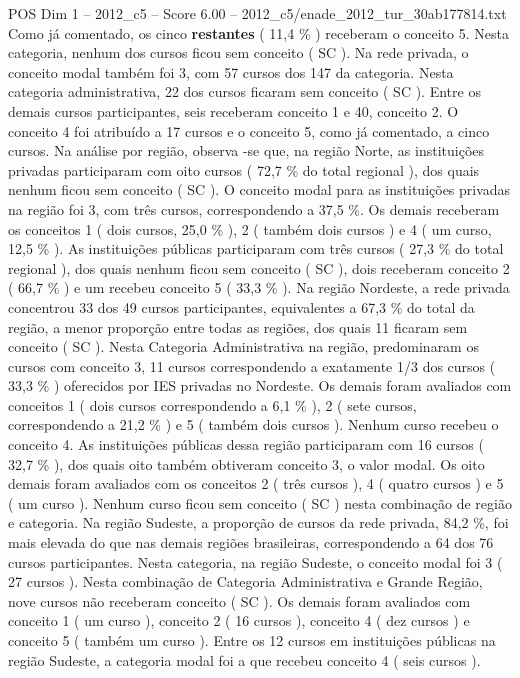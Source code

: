 \begin{textsample}{POS Dim 1 – 2012\_c5 – Score 6.00 – 2012\_c5/enade\_2012\_tur\_30ab177814.txt}
Como já comentado, os cinco \textbf{restantes} ( 11,4 \% ) receberam o conceito 5.
Nesta categoria, nenhum dos cursos ficou sem conceito ( SC ).
Na rede privada, o conceito modal também foi 3, com 57 cursos dos 147 da categoria.
Nesta categoria administrativa, 22 dos cursos ficaram sem conceito ( SC ).
Entre os demais cursos participantes, seis receberam conceito 1 e 40, conceito 2.
O conceito 4 foi atribuído a 17 cursos e o conceito 5, como já comentado, a cinco cursos.
Na análise por região, observa -se que, na região Norte, as instituições privadas participaram com oito cursos ( 72,7 \% do total regional ), dos quais nenhum ficou sem conceito ( SC ).
O conceito modal para as instituições privadas na região foi 3, com três cursos, correspondendo a 37,5 \%.
Os demais receberam os conceitos 1 ( dois cursos, 25,0 \% ), 2 ( também dois cursos ) e 4 ( um curso, 12,5 \% ).
As instituições públicas participaram com três cursos ( 27,3 \% do total regional ), dos quais nenhum ficou sem conceito ( SC ), dois receberam conceito 2 ( 66,7 \% ) e um recebeu conceito 5 ( 33,3 \% ).
Na região Nordeste, a rede privada concentrou 33 dos 49 cursos participantes, equivalentes a 67,3 \% do total da região, a menor proporção entre todas as regiões, dos quais 11 ficaram sem conceito ( SC ).
Nesta Categoria Administrativa na região, predominaram os cursos com conceito 3, 11 cursos correspondendo a exatamente 1/3 dos cursos ( 33,3 \% ) oferecidos por IES privadas no Nordeste.
Os demais foram avaliados com conceitos 1 ( dois cursos correspondendo a 6,1 \% ), 2 ( sete cursos, correspondendo a 21,2 \% ) e 5 ( também dois cursos ).
Nenhum curso recebeu o conceito 4.
As instituições públicas dessa região participaram com 16 cursos ( 32,7 \% ), dos quais oito também obtiveram conceito 3, o valor modal.
Os oito demais foram avaliados com os conceitos 2 ( três cursos ), 4 ( quatro cursos ) e 5 ( um curso ).
Nenhum curso ficou sem conceito ( SC ) nesta combinação de região e categoria.
Na região Sudeste, a proporção de cursos da rede privada, 84,2 \%, foi mais elevada do que nas demais regiões brasileiras, correspondendo a 64 dos 76 cursos participantes.
Nesta categoria, na região Sudeste, o conceito modal foi 3 ( 27 cursos ).
Nesta combinação de Categoria Administrativa e Grande Região, nove cursos não receberam conceito ( SC ).
Os demais foram avaliados com conceito 1 ( um curso ), conceito 2 ( 16 cursos ), conceito 4 ( dez cursos ) e conceito 5 ( também um curso ).
Entre os 12 cursos em instituições públicas na região Sudeste, a categoria modal foi a que recebeu conceito 4 ( seis cursos ).

\end{textsample}
